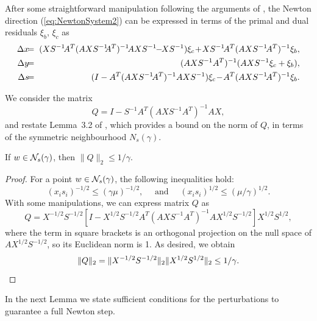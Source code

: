 After some straightforward manipulation following the arguments of 
\cite{GondzioGrothey03}, the Newton
direction (\ref{eq:NewtonSystem2}) can be expressed in terms 
of the primal and dual residuals $\xi_b$, $\xi_c$ as
%
\begin{eqnarray}  \label{eq:Directions}
  \Delta x & \hspace{-1ex} = \hspace{-1ex} & 
  (XS^{-1} \! A^T (AXS^{-1} \!\! A^T)^{-1} \! AXS^{-1} \!\!-\!\! XS^{-1} )\xi_c
  \! + \! XS^{-1} \! A^T (AXS^{-1} \! A^T)^{-1} \xi_b, \nonumber \\
  \Delta y & \hspace{-1ex} = \hspace{-1ex} & 
  (AXS^{-1} A^T)^{-1} (AXS^{-1} \xi_c + \xi_b),                  \\
  \Delta s & \hspace{-1ex} = \hspace{-1ex} & 
  (I - A^T (AXS^{-1} \! A^T)^{-1} AXS^{-1} )\xi_c 
  \! - \! A^T (AXS^{-1} \! A^T)^{-1} \xi_b.            \nonumber
\end{eqnarray}

We consider the matrix
\[
  Q = I - S^{-1} A^T (A X S^{-1} A^T)^{-1} A X,
\]
and restate Lemma~3.2 of \cite{GondzioGrothey03},
which provides a bound on the norm of $Q$, in terms of
the symmetric neighbourhood $N_s(\gamma)$.

\begin{lemma}  \label{th:BoundQ}
If $w \in \mathcal{N}_s(\gamma)$, then $\|Q\|_2 \le 1/\gamma$.
\end{lemma}
%
\begin{proof}
For a point $w \in \mathcal{N}_s(\gamma)$, 
the following inequalities hold:
\[
  (x_i s_i)^{-1/2} \le (\gamma\mu)^{-1/2},
  \quad \mbox{ and } \quad
  (x_i s_i)^{1/2} \le (\mu / \gamma)^{1/2}.
\]
With some manipulations, we can express matrix $Q$ as
\[
Q = X^{-1/2}S^{-1/2} \left[ I - X^{1/2}S^{-1/2}A^T(AXS^{-1}A^T)^{-1}AX^{1/2}S^{-1/2} \right] X^{1/2}S^{1/2},
\]
where the term in square brackets is an orthogonal projection on the null
space of $AX^{1/2}S^{-1/2}$, so its Euclidean norm is 1.
As desired, we obtain
\[
  \| Q \|_2 = \| X^{-1/2}S^{-1/2} \|_2 \| X^{1/2}S^{1/2} \|_2 \le 1/\gamma.
  \qedhere
\]
\end{proof}

In the next Lemma we state sufficient conditions for the perturbations
to guarantee a full Newton step.

